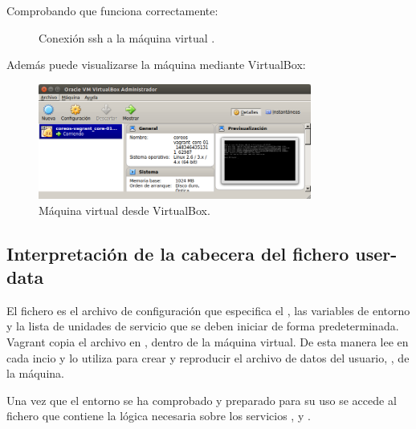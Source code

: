
Comprobando que funciona correctamente:

\begin{figure}[H]
\caption{Conexión ssh a la máquina virtual .\label{fig:figure_placement_example}}
\end{figure}

Además puede visualizarse la máquina mediante VirtualBox:

\begin{figure}[H]
\centering
\includegraphics[width=0.8\textwidth]{images/figures/vboxcore01.png}
\caption{Máquina virtual  desde VirtualBox.\label{fig:figure_placement_example}}
\end{figure}

\subsection{Interpretación de la cabecera del fichero user-data}

El fichero  es el archivo de configuración  que especifica el , las variables de entorno y la lista de unidades de servicio que se deben iniciar de forma predeterminada. Vagrant copia el archivo  en , dentro de la máquina virtual. De esta manera  lee  en cada incio y lo utiliza para crear y reproducir el archivo de datos del usuario, , de la máquina.

Una vez que el entorno se ha comprobado y preparado para su uso se accede al fichero  que contiene la lógica necesaria sobre los servicios ,  y .

